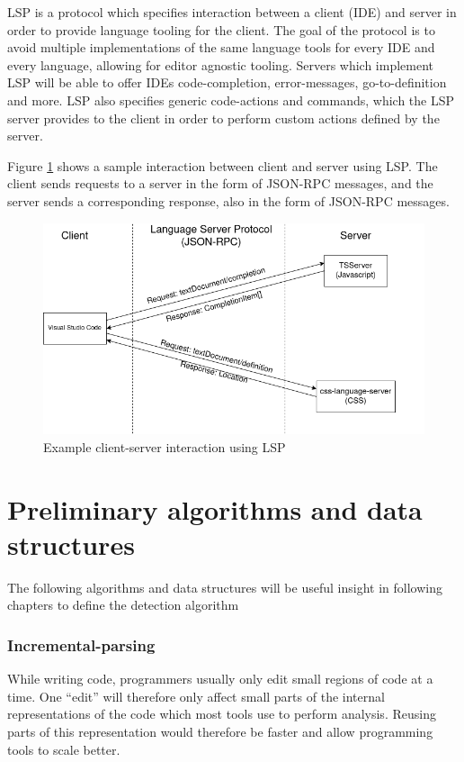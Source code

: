 LSP is a protocol which specifies interaction between a client (IDE) and server in order
to provide language tooling for the client. The goal of the protocol is to avoid multiple
implementations of the same language tools for every IDE and every language, allowing for
editor agnostic tooling. Servers which implement LSP will be able to offer IDEs
code-completion, error-messages, go-to-definition and more. LSP also specifies generic
code-actions and commands, which the LSP server provides to the client in order to perform
custom actions defined by the server.

Figure \ref{fig:lspcommunication} shows a sample interaction between client and server
using LSP. The client sends requests to a server in the form of JSON-RPC messages, and the
server sends a corresponding response, also in the form of JSON-RPC messages.

\begin{figure}[t]
	\includegraphics[width=\textwidth]{images/lspcommunication.png}
	\caption{Example client-server interaction using LSP}
	\label{fig:lspcommunication}
\end{figure}

\section{Preliminary algorithms and data structures}

The following algorithms and data structures will be useful insight in following chapters to
define the detection algorithm

\subsubsection{Incremental-parsing}

While writing code, programmers usually only edit small regions of code at a time. One
``edit'' will therefore only affect small parts of the internal representations of the
code which most tools use to perform analysis. Reusing parts of this representation would
therefore be faster and allow programming tools to scale better. 


